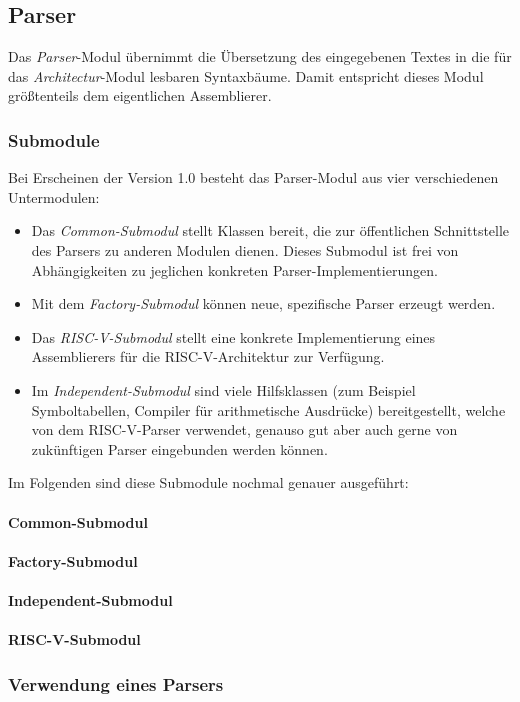 \subsection{Parser}

Das \textit{Parser}-Modul übernimmt die Übersetzung des eingegebenen Textes in die für das \textit{Architectur}-Modul lesbaren Syntaxbäume. Damit entspricht dieses Modul größtenteils dem eigentlichen Assemblierer.

\subsubsection{Submodule}

Bei Erscheinen der Version 1.0 besteht das Parser-Modul aus vier verschiedenen Untermodulen:
\begin{itemize}
\item Das \emph{Common-Submodul} stellt Klassen bereit, die zur öffentlichen Schnittstelle des Parsers zu anderen Modulen dienen. Dieses Submodul ist frei von Abhängigkeiten zu jeglichen konkreten Parser-Implementierungen.
\item Mit dem \emph{Factory-Submodul} können neue, spezifische Parser erzeugt werden.
\item Das \emph{RISC-V-Submodul} stellt eine konkrete Implementierung eines Assemblierers für die RISC-V-Architektur zur Verfügung.
\item Im \emph{Independent-Submodul} sind viele Hilfsklassen (zum Beispiel Symboltabellen, Compiler für arithmetische Ausdrücke) bereitgestellt, welche von dem RISC-V-Parser verwendet, genauso gut aber auch gerne von zukünftigen Parser eingebunden werden können.
\end{itemize}
Im Folgenden sind diese Submodule nochmal genauer ausgeführt:

\paragraph{Common-Submodul}

\paragraph{Factory-Submodul}

\paragraph{Independent-Submodul}

\paragraph{RISC-V-Submodul}

\subsubsection{Verwendung eines Parsers}
